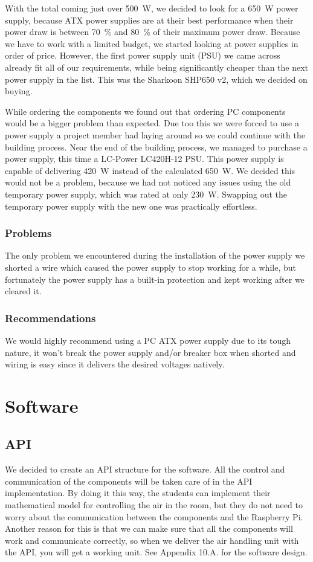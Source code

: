 \documentclass[a4paper,oneside]{book}
\begin{document}
With the total coming just over \SI{500}{\watt}, we decided to look for a
\SI{650}{\watt} power supply, because ATX power supplies are at their best
performance when their power draw is between \SI{70}{\percent} and
\SI{80}{\percent} of their maximum power draw. Because we have to work with a
limited budget, we started looking at power supplies in order of price.
However, the first power supply unit (PSU) we came across already fit all of
our requirements, while being significantly cheaper than the next power supply
in the list. This was the Sharkoon SHP650 v2, which we decided on buying.

While ordering the components we found out that ordering PC components would be
a bigger problem than expected. Due too this we were forced to use a power
supply a project member had laying around so we could continue with the
building process. Near the end of the building process, we managed to purchase
a power supply, this time a LC-Power LC420H-12 PSU. This power supply is
capable of delivering \SI{420}{\watt} instead of the calculated
\SI{650}{\watt}. We decided this would not be a problem, because we had not
noticed any issues using the old temporary power supply, which was rated at
only \SI{230}{\watt}. Swapping out the temporary power supply with the new one
was practically effortless.

\subsection{Problems}
The only problem we encountered during the installation of the power supply we
shorted a wire which caused  the  power supply to stop working for a while, but
fortunately the power supply has a built-in protection and kept working after
we cleared it.

\subsection{Recommendations}
We would highly recommend using a PC ATX power supply due to its tough nature,
it won't break the power supply and/or breaker box when shorted and wiring
is easy since it delivers the desired voltages natively.

\chapter{Software}
\label{ch:software}
\section{API}
We decided to create an API structure for the software. All the control and
communication of the components will be taken care of in the API
implementation. By doing it this way, the students can implement their
mathematical model for controlling the air in the room, but they do not need to
worry about the communication between the components and the Raspberry Pi.
Another reason for this is that we can make sure that all the components will
work and communicate correctly, so when we deliver the air handling unit with
the API, you will get a working unit. See Appendix 10.A. for the software
design.
\end{document}
